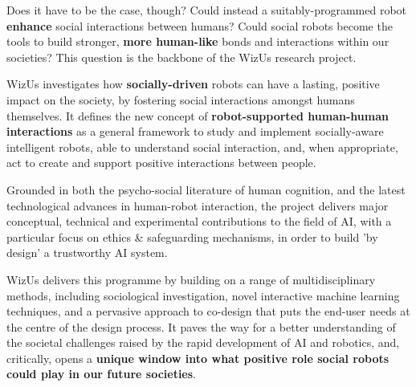\documentclass[11pt]{report}
\newcommand{\project}{WizUs\xspace}
\begin{document}
Does it have to be the case, though? Could instead a suitably-programmed robot
\textbf{enhance} social interactions between humans? Could social robots become
the tools to build stronger, \textbf{more human-like} bonds and
interactions within our societies? This question is the backbone of
the \project research project.

\project investigates how \textbf{socially-driven} robots can have a lasting, positive
impact on the society, by fostering social interactions amongst humans
themselves. It defines the new concept of \textbf{robot-supported human-human
interactions} as a general framework to study and implement socially-aware
intelligent robots, able to understand social interaction, and, when
appropriate, act to create and support positive interactions between people.

Grounded in both the psycho-social literature of human cognition, and the latest
technological advances in human-robot interaction, the project delivers
major conceptual, technical and experimental contributions to the field of AI, 
with a particular focus on ethics \& safeguarding mechanisms, in order to build 'by 
design' a trustworthy AI system.

\project delivers this programme by building on a range of multidisciplinary
methods, including sociological investigation, novel interactive machine
learning techniques, and a pervasive approach to co-design that puts the
end-user needs at the centre of the design process. It paves the way for a
better understanding of the societal challenges raised by the rapid development
of AI and robotics, and, critically, opens a \textbf{unique window into what
positive role social robots could play in our future societies}.

\newpage

\tableofcontents

\pagebreak


\newcommand{\wpOne}{Framing robot-supported human-human interaction}
\newcommand{\wpOneShort}{Framing r-HHI}


\newcommand{\wpTwo}{Ethical-by-design socio-cognitive architecture for robot-supported human-human interactions}
\newcommand{\wpTwoShort}{Socio-cognitive architecture}
\end{document}
